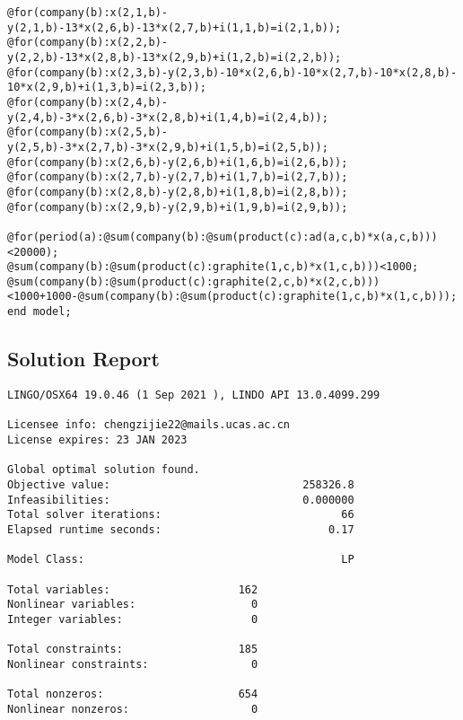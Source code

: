 \documentclass[12pt]{article}
\begin{document}
\begin{appendices}
\begin{lstlisting}
@for(company(b):x(2,1,b)-y(2,1,b)-13*x(2,6,b)-13*x(2,7,b)+i(1,1,b)=i(2,1,b));
@for(company(b):x(2,2,b)-y(2,2,b)-13*x(2,8,b)-13*x(2,9,b)+i(1,2,b)=i(2,2,b));
@for(company(b):x(2,3,b)-y(2,3,b)-10*x(2,6,b)-10*x(2,7,b)-10*x(2,8,b)-
10*x(2,9,b)+i(1,3,b)=i(2,3,b));
@for(company(b):x(2,4,b)-y(2,4,b)-3*x(2,6,b)-3*x(2,8,b)+i(1,4,b)=i(2,4,b));
@for(company(b):x(2,5,b)-y(2,5,b)-3*x(2,7,b)-3*x(2,9,b)+i(1,5,b)=i(2,5,b));
@for(company(b):x(2,6,b)-y(2,6,b)+i(1,6,b)=i(2,6,b));
@for(company(b):x(2,7,b)-y(2,7,b)+i(1,7,b)=i(2,7,b));
@for(company(b):x(2,8,b)-y(2,8,b)+i(1,8,b)=i(2,8,b));
@for(company(b):x(2,9,b)-y(2,9,b)+i(1,9,b)=i(2,9,b));

@for(period(a):@sum(company(b):@sum(product(c):ad(a,c,b)*x(a,c,b)))<20000);
@sum(company(b):@sum(product(c):graphite(1,c,b)*x(1,c,b)))<1000;
@sum(company(b):@sum(product(c):graphite(2,c,b)*x(2,c,b)))
<1000+1000-@sum(company(b):@sum(product(c):graphite(1,c,b)*x(1,c,b)));
end model;
\end{lstlisting}
\subsection{Solution Report}
\begin{lstlisting}
LINGO/OSX64 19.0.46 (1 Sep 2021 ), LINDO API 13.0.4099.299

Licensee info: chengzijie22@mails.ucas.ac.cn  
License expires: 23 JAN 2023

Global optimal solution found.
Objective value:                              258326.8
Infeasibilities:                              0.000000
Total solver iterations:                            66
Elapsed runtime seconds:                          0.17

Model Class:                                        LP

Total variables:                    162
Nonlinear variables:                  0
Integer variables:                    0

Total constraints:                  185
Nonlinear constraints:                0

Total nonzeros:                     654
Nonlinear nonzeros:                   0




\end{lstlisting}
\end{appendices}
\end{document}
